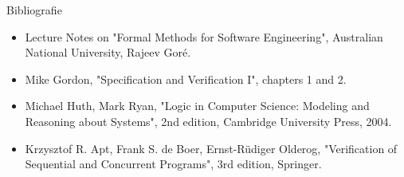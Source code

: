 %
%
%
%
%
%

\begin{frame}{Bibliografie}

{\footnotesize
\begin{itemize}
	\item Lecture Notes on "Formal Methods for Software Engineering", Australian National University, Rajeev Gor\'{e}.
	\item Mike Gordon, "Specification and Verification I", chapters 1 and 2.
	\item Michael Huth, Mark Ryan, "Logic in Computer Science: Modeling and Reasoning about Systems", 2nd edition, Cambridge University Press, 2004.
	\item Krzysztof R. Apt, Frank S. de Boer, Ernst-R\"{u}diger Olderog, "Verification of Sequential and Concurrent Programs", 3rd edition,  Springer.
\end{itemize}
}
\end{frame}

